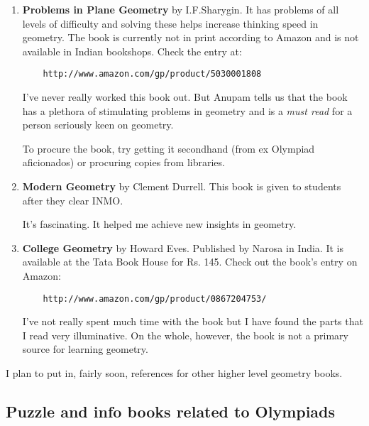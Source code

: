 \documentclass[a4paper]{amsart}
\begin{document}
\begin{enumerate}

\item {\bf Problems in Plane Geometry} by I.F.Sharygin. It has problems of all levels of difficulty and solving these helps
  increase thinking speed in geometry. The book is currently not in print according to Amazon and is not available in Indian bookshops. 
  Check the entry at:
  
  \begin{verbatim}
    http://www.amazon.com/gp/product/5030001808
  \end{verbatim}

  I've never really worked this book out. But Anupam
  tells us that the book has a plethora of stimulating problems in geometry and is a {\em must read} for a person
  seriously keen on geometry.

  To procure the book, try getting it secondhand (from ex Olympiad aficionados) or procuring copies from libraries.

\item {\bf Modern Geometry} by Clement Durrell. This book is given to students after they clear INMO.

  It's fascinating. It helped me achieve new insights in geometry.

\item {\bf College Geometry} by Howard Eves. Published by Narosa in India. It is available at the Tata Book House for Rs. 145.
  Check out the book's entry on Amazon:
  \begin{verbatim}
    http://www.amazon.com/gp/product/0867204753/
  \end{verbatim}

  I've not really spent much time with the book but I have found the parts that I read very illuminative. On the whole, however,
  the book is not a primary source for learning geometry.
\end{enumerate}

I plan to put in, fairly soon, references for other higher level geometry books.

\subsection{Puzzle and info books related to Olympiads}
\end{document}
